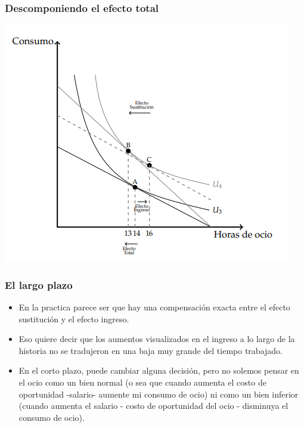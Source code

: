 \documentclass{beamer}
\begin{document}
\begin{frame}
  \frametitle{Descomponiendo el efecto total}
  \begin{center}
    \includegraphics[scale=0.9]{../Figures/C9.11.png}
  \end{center}
\end{frame}

\begin{frame}
  \frametitle{El largo plazo}
  \begin{itemize}

    \item En la practica parece ser que hay una compensación exacta entre el efecto sustitución y el efecto ingreso.
    \item Eso quiere decir que los aumentos visualizados en el ingreso a lo largo de la historia no se tradujeron en una baja muy grande del tiempo trabajado.
    \item En el corto plazo, puede cambiar alguna decisión, pero no solemos pensar en el ocio como un bien normal (o sea que cuando aumenta el costo de oportunidad -salario- aumente mi consumo de ocio) ni como un bien inferior (cuando aumenta el salario - costo de oportunidad del ocio - disminuya el consumo de ocio).

  \end{itemize}

\end{frame}
\end{document}
